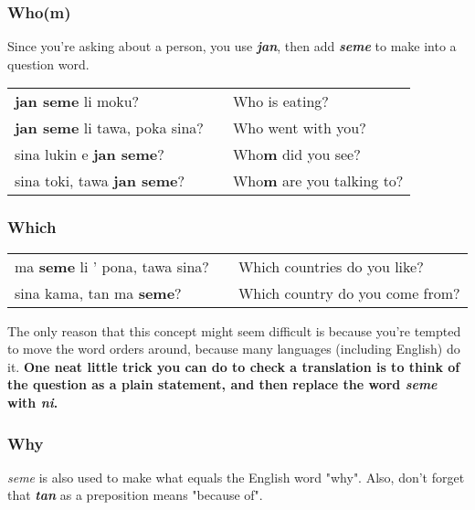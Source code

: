 \subsubsection*{Who(m)}
%
Since you're asking about a person, you use \textbf{\textit{jan}}, then add \textbf{\textit{seme}} to make into a question word. 

\begin{supertabular}{p{5,5cm}|ll}
\textbf{jan seme} li moku? && Who is eating? \\
\textbf{jan seme} li tawa, poka sina? && Who went with you? \\
sina lukin e \textbf{jan seme}? && Who\textbf{m} did you see? \\
sina toki, tawa \textbf{jan seme}? && Who\textbf{m} are you talking to? \\
\end{supertabular} 
%
\subsubsection*{Which}
%
\begin{supertabular}{p{5,5cm}|ll}
ma \textbf{seme} li ' pona, tawa sina? && Which countries do you like? \\
sina kama, tan ma \textbf{seme}? && Which country do you come from? \\ 
\end{supertabular} 

The only reason that this concept might seem difficult is because you're tempted to move the word orders around, because many languages (including English) do it. 
\textbf{One neat little trick you can do to check a translation is to think of the question as a plain statement, and then replace the word \textit{seme} with \textit{ni}.} 
%
{}
\subsubsection*{Why}
%
\textit{seme} is also used to make what equals the English word "why". 
Also, don't forget that \textbf{\textit{tan}} as a preposition means "because of".

